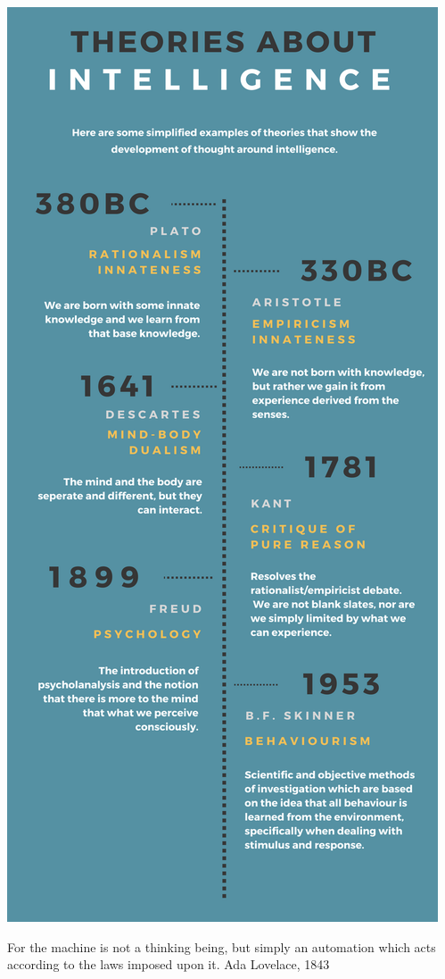 \documentclass[11pt]{article}
\begin{document}
\includegraphics{img}

For the machine is not a thinking being, but simply an automation which acts
according to the laws imposed upon it.
Ada Lovelace, 1843
\end{document}
